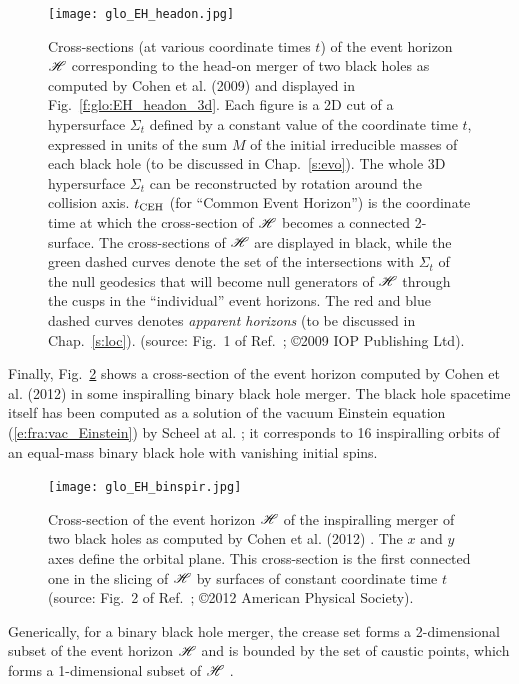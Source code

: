\begin{figure}
\centerline{\texttt{[image: glo\_EH\_headon.jpg]}}
\caption[]{\label{f:glo:EH_headon} \footnotesize
Cross-sections (at various coordinate times $t$) of the event horizon $\mathscr{H}$ corresponding
to the head-on merger of two black holes as computed by Cohen et al. (2009) \cite{CohenPS09}
and displayed in Fig.~\ref{f:glo:EH_headon_3d}.
Each figure is a 2D cut of a hypersurface $\Sigma_t$ defined by a constant
value of the coordinate time $t$, expressed in units of the sum $M$ of the
initial irreducible masses of each black
hole (to be discussed in Chap.~\ref{s:evo}). The whole 3D hypersurface $\Sigma_t$ can be reconstructed
by rotation around the collision axis.
$t_{\rm CEH}$ (for ``Common Event Horizon'')
is the coordinate time at which the cross-section of $\mathscr{H}$ becomes a connected
2-surface.
The cross-sections of $\mathscr{H}$ are displayed
in black, while the green dashed curves denote the set of the intersections
with $\Sigma_t$ of the null geodesics that
will become null generators of $\mathscr{H}$ through the cusps in the
``individual'' event horizons.
The red and blue dashed curves denotes \emph{apparent horizons} (to be discussed in
Chap.~\ref{s:loc}).
(source: Fig.~1 of Ref.~\cite{CohenPS09}; \copyright  2009 IOP Publishing Ltd).}
\end{figure}

Finally, Fig.~\ref{f:glo:EH_binspir} shows a cross-section
of the event horizon computed by Cohen et al. (2012) \cite{CohenKS12}
in some inspiralling binary black hole merger. The
black hole spacetime itself has been computed as a solution of the vacuum
Einstein equation (\ref{e:fra:vac_Einstein}) by Scheel at al. \cite{ScheeBCKMP09}; it corresponds to
16 inspiralling orbits of an equal-mass binary black hole with vanishing initial
spins.

\begin{figure}
\centerline{\texttt{[image: glo\_EH\_binspir.jpg]}}
\caption[]{\label{f:glo:EH_binspir} \footnotesize
Cross-section of the event horizon $\mathscr{H}$ of the inspiralling merger of
two black holes as computed by Cohen et al. (2012) \cite{CohenKS12}.
The $x$ and $y$ axes define the orbital plane.
This cross-section is the first connected one in the slicing of $\mathscr{H}$
by surfaces of constant coordinate time $t$
(source: Fig.~2 of Ref.~\cite{CohenKS12}; \copyright 2012 American Physical Society).}
\end{figure}

Generically, for a binary black hole merger,
the crease set forms a 2-dimensional subset of the event horizon
$\mathscr{H}$ and is bounded by the set of caustic points, which forms a 1-dimensional
subset of $\mathscr{H}$ \cite{Siino98a,Siino98b,HusaW99,CohenKS12}.


